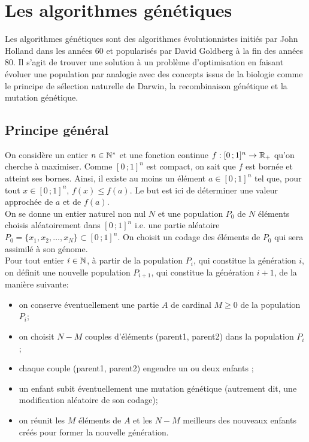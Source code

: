 \chapter{Les algorithmes génétiques}
Les algorithmes génétiques sont des algorithmes évolutionnistes initiés par John Holland dans les années 60 et popularisés par David Goldberg à la fin des années 80. Il s'agit de trouver une solution à un problème d'optimisation en faisant évoluer une population par analogie avec des concepts issus de la biologie comme le principe de sélection naturelle de Darwin, la recombinaison génétique et la mutation génétique. 

\section{Principe général}
On considère un entier $n\in\mathbb{N}^*$ et une fonction continue $f: [0\,; 1]^n \to \mathbb{R}_+$ qu'on cherche à maximiser. Comme $[0\,; 1]^n$ est compact, on sait que $f$ est bornée et atteint ses bornes. Ainsi, il existe au moins un élément $a\in [0\,; 1]^n$ tel que, pour tout $x\in [0\,; 1]^n$, $f(x) \leqslant f(a)$. Le but est ici de déterminer une valeur approchée de $a$ et de $f(a)$. \\

On se donne un entier naturel non nul $N$ et une population $P_0$ de $N$ éléments choisis aléatoirement dans $[0\,; 1]^n$ i.e. une partie aléatoire $P_0=\{x_1, x_2, \ldots, x_N\} \subset [0\,; 1]^n$. On choisit un codage des éléments de $P_0$ qui sera assimilé à son génome. \\

Pour tout entier $i\in\mathbb{N}$, à partir de la population $P_i$, qui constitue la génération $i$, on définit une nouvelle population $P_{i+1}$, qui constitue la génération $i+1$, de la manière suivante:
\begin{itemize}
	\item on conserve éventuellement une partie $A$ de cardinal $M \geqslant 0$ de la population $P_i$;
	\item on choisit $N-M$ couples d'éléments (parent1, parent2) dans la population $P_i$;
	\item chaque couple (parent1, parent2) engendre un ou deux \og enfants \fg{};
	\item un \og enfant \fg{} subit éventuellement une mutation génétique (autrement dit, une modification aléatoire de son codage);
	\item on réunit les $M$ éléments de $A$ et les $N-M$ meilleurs des nouveaux \og enfants \fg{} créés pour former la nouvelle génération. \\
\end{itemize}

